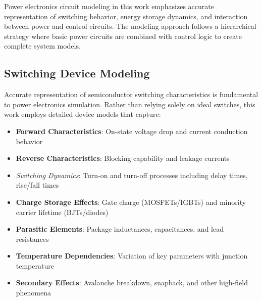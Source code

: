 Power electronics circuit modeling in this work emphasizes accurate representation of switching behavior, energy storage dynamics, and interaction between power and control circuits. The modeling approach follows a hierarchical strategy where basic power circuits are combined with control logic to create complete system models.

\subsection{Switching Device Modeling}
Accurate representation of semiconductor switching characteristics is fundamental to power electronics simulation. Rather than relying solely on ideal switches, this work employs detailed device models that capture:
\begin{itemize}
    \item \textbf{Forward Characteristics}: On-state voltage drop and current conduction behavior
    \item \textbf{Reverse Characteristics}: Blocking capability and leakage currents
    \item \qquad \textit{Switching Dynamics}: Turn-on and turn-off processes including delay times, rise/fall times
    \item \textbf{Charge Storage Effects}: Gate charge (MOSFETs/IGBTs) and minority carrier lifetime (BJTs/diodes)
    \item \textbf{Parasitic Elements}: Package inductances, capacitances, and lead resistances
    \item \textbf{Temperature Dependencies}: Variation of key parameters with junction temperature
    \item \textbf{Secondary Effects}: Avalanche breakdown, snapback, and other high-field phenomena
\end{itemize}


